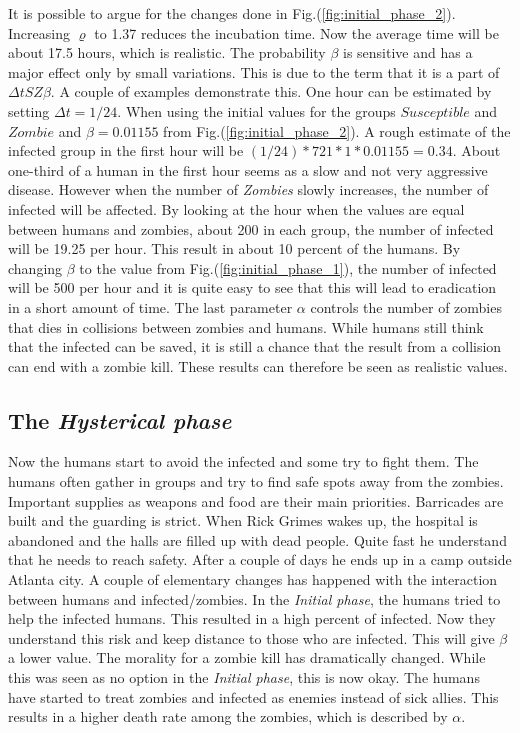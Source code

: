 \documentclass[%
twoside,                 %
final,                   %
chapterprefix=true,      %
open=right               %
10pt]{book}
\begin{document}
It is possible to argue for the changes done in Fig.(\ref{fig:initial_phase_2}). Increasing $\varrho$ to 1.37 reduces the incubation time. Now the average time will be about 17.5 hours, which is realistic. The probability $\beta$ is sensitive and has a major effect only by small variations. This is due to the term that it is a part of $\Delta t SZ \beta$. A couple of examples demonstrate this. One hour can be estimated by setting $\Delta t = 1/24$. When using the initial values for the groups $Susceptible$ and $Zombie$ and $\beta=0.01155$ from Fig.(\ref{fig:initial_phase_2}). A rough estimate of the infected group in the first hour will be $(1/24)*721*1*0.01155=0.34$. About one-third of a human in the first hour seems as a slow and not very aggressive disease. However when the number of \emph{Zombies} slowly increases, the number of infected will be affected. By looking at the hour when the values are equal between humans and zombies, about 200 in each group, the number of infected will be 19.25 per hour. This result in about 10 percent of the humans. By changing $\beta$ to the value from Fig.(\ref{fig:initial_phase_1}), the number of infected will be 500 per hour and it is quite easy to see that this will lead to eradication in a short amount of time. The last parameter $\alpha$ controls the number of zombies that dies in collisions between zombies and humans. While humans still think that the infected can be saved, it is still a chance that the result from a collision can end with a zombie kill. These results can therefore be seen as realistic values.

\subsection{The \emph{Hysterical phase}}
Now the humans start to avoid the infected and some try to fight them. The humans often gather in groups and try to find safe spots away from the zombies. Important supplies as weapons and food are their main priorities. Barricades are built and the guarding is strict. When Rick Grimes wakes up, the hospital is abandoned and the halls are filled up with dead people. Quite fast he understand that he needs to reach safety. After a couple of days he ends up in a camp outside Atlanta city. A couple of elementary changes has happened with the interaction between humans and infected/zombies. In the \emph{Initial phase}, the humans tried to help the infected humans. This resulted in a high percent of infected. Now they understand this risk and keep distance to those who are infected. This will give $\beta$ a lower value. The morality for a zombie kill has dramatically changed. While this was seen as no option in the \emph{Initial phase}, this is now okay. The humans have started to treat zombies and infected as enemies instead of sick allies. This results in a higher death rate among the zombies, which is described by $\alpha$. 
\end{document}
